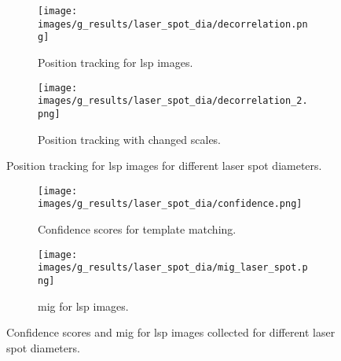     \begin{figure}[ht]
        \centering
        \begin{subfigure}[b]{0.65\textwidth}
            \centering
            \texttt{[image: images/g\_results/laser\_spot\_dia/decorrelation.png]}
            \caption{Position tracking for \gls{lsp} images.}
            \label{subfig:laser_spot_dia/decorrelation.png}
        \end{subfigure}
        
        \vspace{3mm}
        
        \begin{subfigure}[b]{0.65\textwidth}
            \centering
            \texttt{[image: images/g\_results/laser\_spot\_dia/decorrelation\_2.png]}
            \caption{Position tracking with changed scales.}
            \label{subfig:laser_spot_dia/decorrelation_2.png}
        \end{subfigure}
        \caption{Position tracking for \gls{lsp} images for different laser spot diameters.}
        \label{fig:position_tracking}
    \end{figure}

    \begin{figure}[ht]
        \centering
        \begin{subfigure}[b]{0.65\textwidth}
            \centering
            \texttt{[image: images/g\_results/laser\_spot\_dia/confidence.png]}
            \caption{Confidence scores for template matching.}
            \label{subfig:laser_spot_dia/confidence.png}
        \end{subfigure}

        \vspace{3mm}
        
        \begin{subfigure}[b]{0.65\textwidth}
            \centering
            \texttt{[image: images/g\_results/laser\_spot\_dia/mig\_laser\_spot.png]}
            \caption{\gls{mig} for \gls{lsp} images.}
            \label{subfig:laser_spot_dia/mig_laser_spot.png}
        \end{subfigure} 
        \caption{Confidence scores and \gls{mig} for \gls{lsp} images collected for different laser spot diameters.}
        \label{fig:laser_spot_dia_results}
    \end{figure}



